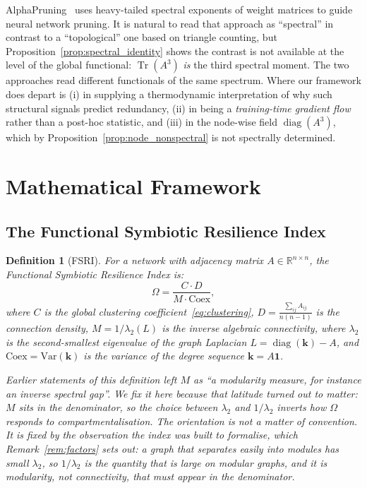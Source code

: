 \documentclass[11pt,a4paper]{article}
\newtheorem{definition}{Definition}
\begin{document}
AlphaPruning~\cite{lu2024alpha} uses heavy-tailed spectral exponents
of weight matrices to guide neural network pruning. It is natural to read
that approach as ``spectral'' in contrast to a ``topological'' one based on
triangle counting, but Proposition~\ref{prop:spectral_identity} shows the
contrast is not available at the level of the global functional:
$\operatorname{Tr}(A^3)$ \emph{is} the third spectral moment. The two
approaches read different functionals of the same spectrum. Where our
framework does depart is (i) in supplying a thermodynamic interpretation of
why such structural signals predict redundancy, (ii) in being a
\emph{training-time gradient flow} rather than a post-hoc statistic, and
(iii) in the node-wise field $\operatorname{diag}(A^3)$, which by
Proposition~\ref{prop:node_nonspectral} is not spectrally determined.

\section{Mathematical Framework}

\subsection{The Functional Symbiotic Resilience Index}

\begin{definition}[FSRI]
\label{def:fsri}
For a network with adjacency matrix $A \in \mathbb{R}^{n \times n}$,
the Functional Symbiotic Resilience Index is:
\begin{equation}
\Omega = \frac{C \cdot D}{M \cdot \mathrm{Coex}},
\label{eq:fsri}
\end{equation}
where $C$ is the global clustering coefficient~\eqref{eq:clustering},
$D = \frac{\sum_{ij} A_{ij}}{n(n-1)}$ is the connection density,
$M = 1/\lambda_2(L)$ is the inverse algebraic connectivity, where
$\lambda_2$ is the second-smallest eigenvalue of the graph Laplacian
$L = \operatorname{diag}(\mathbf{k}) - A$, and
$\mathrm{Coex} = \mathrm{Var}(\mathbf{k})$ is the variance of the degree
sequence $\mathbf{k} = A\mathbf{1}$.

Earlier statements of this definition left $M$ as ``a modularity measure, for
instance an inverse spectral gap''. We fix it here because that latitude turned
out to matter: $M$ sits in the denominator, so the choice between $\lambda_2$
and $1/\lambda_2$ \emph{inverts} how $\Omega$ responds to compartmentalisation.
The orientation is not a matter of convention. It is fixed by the observation
the index was built to formalise, which Remark~\ref{rem:factors} sets out: a
graph that separates easily into modules has small $\lambda_2$, so $1/\lambda_2$
is the quantity that is large on modular graphs, and it is modularity, not
connectivity, that must appear in the denominator.
\end{definition}
\end{document}
